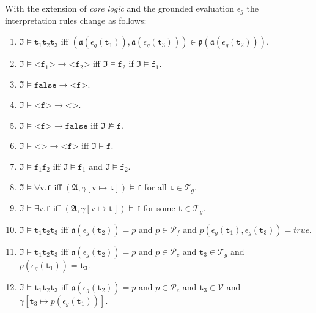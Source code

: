 \documentclass[runningheads]{llncs}
\begin{document}
With the extension of \emph{core logic} and the grounded evaluation $\epsilon_g$ the interpretation rules change as follows:

\begin{enumerate}
  \item $\mathfrak{I} \vDash \texttt{t}_1 \texttt{t}_2 \texttt{t}_3$ iff $(\mathfrak{a}(\epsilon_g(\texttt{t}_1)), \mathfrak{a}(\epsilon_g(\texttt{t}_3))) \in \mathfrak{p}(\mathfrak{a}(\epsilon_g(\texttt{t}_2)))$.
  \item $\mathfrak{I} \vDash \texttt{<f}_1\texttt{>} \rightarrow \texttt{<f}_2\texttt{>}$ iff $\mathfrak{I} \vDash \texttt{f}_2$ if $\mathfrak{I} \vDash \texttt{f}_1$.
  \item $\mathfrak{I} \vDash \texttt{false} \rightarrow \texttt{<f>}$.
  \item $\mathfrak{I} \vDash \texttt{<f>} \rightarrow \texttt{<>}$.
  \item $\mathfrak{I} \vDash \texttt{<f>} \rightarrow \texttt{false}$ iff $\mathfrak{I} \nvDash \texttt{f}$.
  \item $\mathfrak{I} \vDash \texttt{<>} \rightarrow \texttt{<f>}$ iff $\mathfrak{I} \vDash \texttt{f}$.
  \item $\mathfrak{I} \vDash \texttt{f}_1 \texttt{f}_2$ iff $\mathfrak{I} \vDash \texttt{f}_1$ and $\mathfrak{I} \vDash \texttt{f}_2$.
  \item $\mathfrak{I} \vDash \forall\texttt{v.f}$ iff $(\mathfrak{A}, \gamma\left[\texttt{v} \mapsto \texttt{t}\right]) \vDash \texttt{f}$ for all $\texttt{t} \in \mathcal{T}_g$.
  \item $\mathfrak{I} \vDash \exists\texttt{v.f}$ iff $(\mathfrak{A}, \gamma\left[\texttt{v} \mapsto \texttt{t}\right]) \vDash \texttt{f}$ for some $\texttt{t} \in \mathcal{T}_g$.
  \item $\mathfrak{I} \vDash \texttt{t}_1 \texttt{t}_2 \texttt{t}_3$ iff $\mathfrak{a}(\epsilon_g(\texttt{t}_2)) = p$ and $p \in \mathcal{P}_f$ and $p(\epsilon_g(\texttt{t}_1), \epsilon_g(\texttt{t}_3) ) = true$.
  \item $\mathfrak{I} \vDash \texttt{t}_1 \texttt{t}_2 \texttt{t}_3$ iff $\mathfrak{a}(\epsilon_g(\texttt{t}_2)) = p$ and $p \in \mathcal{P}_c$ and $\texttt{t}_3 \in \mathcal{T}_g$ and $p(\epsilon_g(\texttt{t}_1)) = \texttt{t}_3$.
  \item $\mathfrak{I} \vDash \texttt{t}_1 \texttt{t}_2 \texttt{t}_3$ iff $\mathfrak{a}(\epsilon_g(\texttt{t}_2)) = p$ and $p \in \mathcal{P}_c$ and $\texttt{t}_3 \in \mathcal{V}$ and $\gamma\left[\texttt{t}_3 \mapsto p(\epsilon_g(\texttt{t}_1))\right]$.
\end{enumerate}
\end{document}
